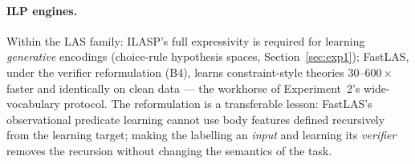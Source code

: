 \documentclass[review,12pt]{elsarticle}
\theoremstyle{definition}
\theoremstyle{remark}
\begin{document}
\paragraph{ILP engines.} Within the LAS family: ILASP's full expressivity is
required for learning \emph{generative} encodings (choice-rule hypothesis
spaces, Section~\ref{sec:exp1}); FastLAS, under the verifier reformulation
(B4), learns constraint-style theories $30$--$600\times$ faster and identically
on clean data --- the workhorse of Experiment~2's wide-vocabulary protocol.
The reformulation is a transferable lesson: FastLAS's observational predicate
learning cannot use body features defined recursively from the learning
target; making the labelling an \emph{input} and learning its \emph{verifier}
removes the recursion without changing the semantics of the task.
\end{document}

